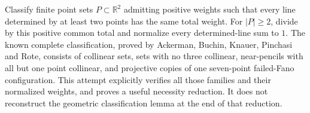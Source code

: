 Classify finite point sets $P\subset\mathbb R^2$ admitting positive weights such that every line determined by at least two points has the same total weight. For $|P|\ge2$, divide by this positive common total and normalize every determined-line sum to $1$.
The known complete classification, proved by Ackerman, Buchin, Knauer, Pinchasi and Rote, consists of collinear sets, sets with no three collinear, near-pencils with all but one point collinear, and projective copies of one seven-point failed-Fano configuration. This attempt explicitly verifies all those families and their normalized weights, and proves a useful necessity reduction. It does not reconstruct the geometric classification lemma at the end of that reduction.
